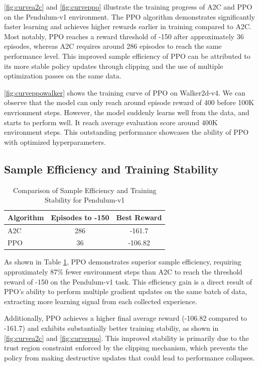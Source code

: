 \documentclass[a4paper,twocolumn]{article}
\begin{document}
\autoref{fig:curvea2c} and \autoref{fig:curveppo} illustrate the training progress of A2C and PPO on the Pendulum-v1 environment. The PPO algorithm demonstrates significantly faster learning and achieves higher rewards earlier in training compared to A2C. Most notably, PPO reaches a reward threshold of -150 after approximately 36 episodes, whereas A2C requires around 286 episodes to reach the same performance level. This improved sample efficiency of PPO can be attributed to its more stable policy updates through clipping and the use of multiple optimization passes on the same data.

\autoref{fig:curveppowalker} shows the training curve of PPO on Walker2d-v4. We can observe that the model can only reach around episode reward of 400 before 100K envrionment steps. However, the model suddenly learns well from the data, and starts to perform well. It reach average evaluation score around 400K environment steps. This outstanding performance showcases the ability of PPO with optimized hyperparameters.


\subsection{Sample Efficiency and Training Stability}

\begin{table}[H]
\centering
\caption{Comparison of Sample Efficiency and Training Stability for Pendulum-v1}
\label{tab:efficiency_comparison}
\begin{tabular}{lcc}
\toprule
\textbf{Algorithm} & \textbf{Episodes to -150} & \textbf{Best Reward} \\
\midrule
A2C & 286 & -161.7 \\
PPO & 36 &  -106.82 \\
\bottomrule
\end{tabular}
\end{table}

As shown in Table \ref{tab:efficiency_comparison}, PPO demonstrates superior sample efficiency, requiring approximately 87\% fewer environment steps than A2C to reach the threshold reward of -150 on the Pendulum-v1 task. This efficiency gain is a direct result of PPO's ability to perform multiple gradient updates on the same batch of data, extracting more learning signal from each collected experience.

Additionally, PPO achieves a higher final average reward (-106.82 compared to -161.7) and exhibits substantially better training stabiliy, as shown in \autoref{fig:curvea2c} and \autoref{fig:curveppo}. This improved stability is primarily due to the trust region constraint enforced by the clipping mechanism, which prevents the policy from making destructive updates that could lead to performance collapses.
\end{document}
